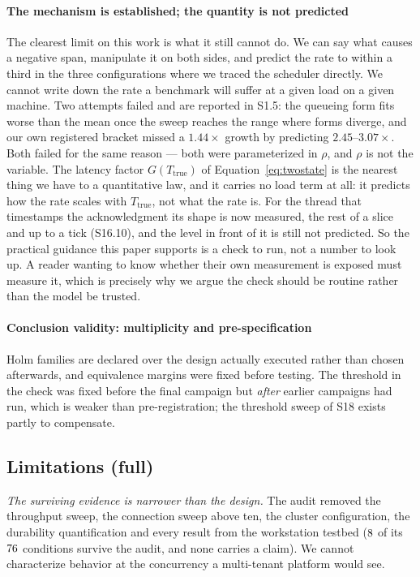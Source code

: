 \documentclass[10pt,journal,onecolumn]{IEEEtran}
\begin{document}
\paragraph{The mechanism is established; the quantity is not predicted} The clearest limit on
this work is what it still cannot do. We can say what causes a negative span, manipulate it on both
sides, and predict the rate to within a third in the three configurations where we traced the scheduler
directly. We cannot write down the rate a benchmark will suffer at a given load on a given
machine. Two attempts failed and are reported in S1.5: the queueing form fits worse than the mean once the
sweep reaches the range where forms diverge, and our own registered bracket missed a $1.44\times$
growth by predicting $2.45$--$3.07\times$. Both failed for the same reason --- both were
parameterized in $\rho$, and $\rho$ is not the variable. The latency factor
$G(T_{\mathrm{true}})$ of Equation~\ref{eq:twostate} is the nearest thing we have to a
quantitative law, and it carries no load term at all: it predicts how the rate scales with
$T_{\mathrm{true}}$, not what the rate is. For the thread that timestamps the acknowledgment
its shape is now measured, the rest of a slice and up to a tick (S16.10), and the level in front
of it is still not predicted. So the practical guidance this paper supports is a check to run, not a number to look up. A
reader wanting to know whether their own measurement is exposed must measure it, which is
precisely why we argue the check should be routine rather than the model be trusted.

\paragraph{Conclusion validity: multiplicity and pre-specification} Holm families are declared
over the design actually executed rather than chosen afterwards, and equivalence margins were
fixed before testing. The threshold in the check was fixed before the final campaign but
\emph{after} earlier campaigns had run, which is weaker than pre-registration; the threshold
sweep of S18 exists partly to compensate.



\subsection*{Limitations (full)}

\emph{The surviving evidence is narrower than the design.} The audit removed the throughput
sweep, the connection sweep above ten, the cluster configuration, the durability quantification and
every result from the workstation testbed ($8$ of its
$76$ conditions survive the audit, and none carries a claim). We cannot characterize behavior at the concurrency a multi-tenant platform would see.
\end{document}
